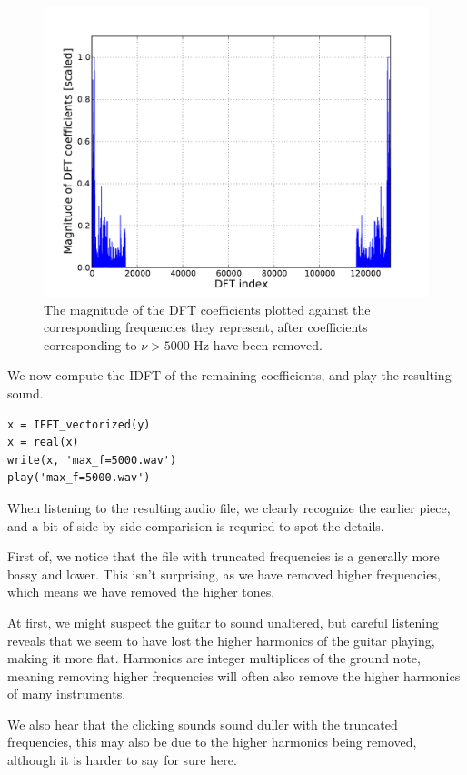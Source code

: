 \documentclass[a4paper, 11pt, notitlepage, english]{article}
\begin{document}
\begin{figure}[p]
\centering
\includegraphics[width=\textwidth]{trunc2}
\caption{The magnitude of the DFT coefficients plotted against the corresponding frequencies they represent, after coefficients corresponding to $\nu > 5000$ Hz have been removed.}
\end{figure}

We now compute the IDFT of the remaining coefficients, and play the resulting sound.
\begin{lstlisting}
x = IFFT_vectorized(y)
x = real(x)
write(x, 'max_f=5000.wav')
play('max_f=5000.wav')        
\end{lstlisting}
    
When listening to the resulting audio file, we clearly recognize the earlier piece, and a bit of side-by-side comparision is requried to spot the details.

First of, we notice that the file with truncated frequencies is a generally more bassy and lower. This isn't surprising, as we have removed higher frequencies, which means we have removed the higher tones. 

At first, we might suspect the guitar to sound unaltered, but careful listening reveals that we seem to have lost the higher harmonics of the guitar playing, making it more flat. Harmonics are integer multiplices of the ground note, meaning removing higher frequencies will often also remove the higher harmonics of many instruments.

We also hear that the clicking sounds sound duller with the truncated frequencies, this may also be due to the higher harmonics being removed, although it is harder to say for sure here.
\end{document}

